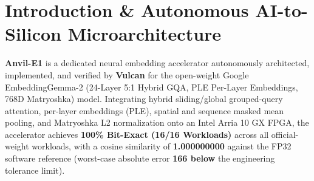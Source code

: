 \documentclass[11pt,a4paper]{article}
\begin{document}
\section{Introduction \& Autonomous AI-to-Silicon Microarchitecture}

\textbf{Anvil-E1} is a dedicated neural embedding accelerator autonomously architected, implemented, and verified by \textbf{Vulcan} for the open-weight Google EmbeddingGemma-2 (\allowbreak{}24-Layer 5:1 Hybrid GQA,\allowbreak{} PLE Per-Layer Embeddings,\allowbreak{} 768D Matryoshka)\allowbreak{} model. Integrating hybrid sliding/global grouped-query attention, per-layer embeddings (PLE), spatial and sequence masked mean pooling, and Matryoshka L2 normalization onto an Intel Arria 10 GX FPGA, the accelerator achieves \textbf{100\% Bit-Exact (\allowbreak{}16/\allowbreak{}16 Workloads)\allowbreak{}} across all official-weight workloads, with a cosine similarity of \textbf{1.000000000} against the FP32 software reference (worst-case absolute error \textbf{166\texttimes{} below} the engineering tolerance limit).

\vspace{2pt}
\end{document}
